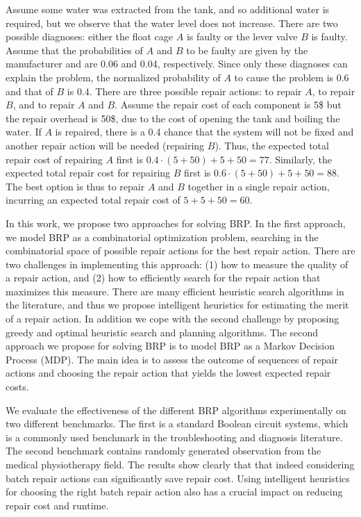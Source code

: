 \documentclass[review]{elsarticle}
\newcommand\roni[1]{\textcolor{green}{roni: #1}}
\begin{document}
Assume some water was extracted from the tank, and so additional water is required, but we observe that the water level does not increase. There are two possible diagnoses: either the float cage $A$ is faulty or the lever valve $B$ is faulty. Assume that the probabilities of $A$ and $B$ to be faulty are given by the manufacturer and are 0.06 and 0.04, respectively. Since only these diagnoses can explain the problem, the normalized probability of $A$ to cause the problem is 0.6 and that of $B$ is 0.4. There are three possible repair actions: to repair $A$, to repair $B$, and to repair $A$ and $B$. Assume the repair cost of each component is 5\$ but the repair overhead is 50\$, due to the cost of opening the tank and boiling the water. If $A$ is repaired, there is a 0.4 chance that the system will not be fixed and another repair action will be needed (repairing $B$). Thus, the expected total repair cost of repairing $A$ first is $0.4\cdot(5+50)+5+50=77$. Similarly, the expected total repair cost for repairing $B$ first is $0.6\cdot(5+50)+5+50=88$. The best option is thus to repair $A$ and $B$ together in a single repair action, incurring an expected total repair cost of $5+5+50=60$.


In this work, we propose two approaches for solving BRP. In the first approach, we model BRP as a combinatorial optimization problem, searching in the combinatorial space of possible repair actions for the best repair action. There are two challenges in implementing this approach: (1) how to measure the quality of a repair action, and (2) how to efficiently search for the repair action that maximizes this measure. There are many efficient heuristic search algorithms in the literature, and thus we propose intelligent heuristics for estimating the merit of a repair action. In addition we cope with the second challenge by proposing greedy and optimal heuristic search and planning algorithms.
The second approach we propose for solving BRP is to model BRP as a Markov Decision Process (MDP). The main idea is 
to assess the outcome of sequences of repair actions and choosing the repair action that yields the lowest expected repair costs. 


We evaluate the effectiveness of the different BRP algorithms experimentally on two different benchmarks. The first is a standard Boolean circuit systems, which is a commonly used benchmark in the troubleshooting and diagnosis literature. The second benchmark  contains randomly generated observation from the medical physiotherapy field.
The results show clearly that that indeed considering batch repair actions can significantly save repair cost. 
Using intelligent heuristics for choosing the right batch repair action also has a crucial impact on reducing repair cost and runtime. 
\end{document}
